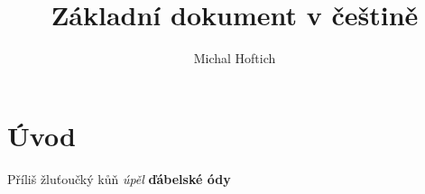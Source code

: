 \documentclass{article}
\title{Základní dokument v češtině}
\author{Michal Hoftich}
\begin{document}
\maketitle
\tableofcontents
\section{Úvod}
Příliš žluťoučký kůň \textit{úpěl} \textbf{ďábelské ódy} \parencite{article-full}

\printbibliography
\end{document}
